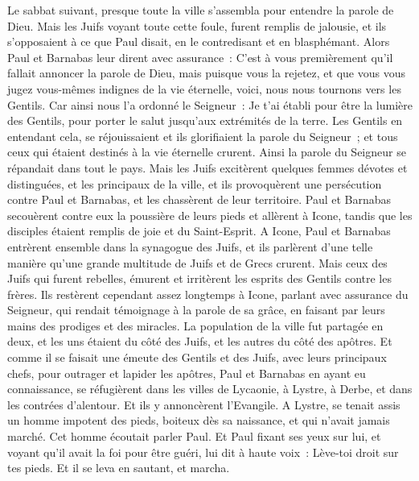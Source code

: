 \begin{multicols}{2}
Le sabbat suivant, presque toute la ville s'assembla pour entendre la parole de Dieu.
Mais les Juifs voyant toute cette foule, furent remplis de jalousie, et ils s'opposaient à ce que Paul disait, en le contredisant et en blasphémant.
Alors Paul et Barnabas leur dirent avec assurance~: C'est à vous premièrement qu'il fallait annoncer la parole de Dieu, mais puisque vous la rejetez, et que vous vous jugez vous-mêmes indignes de la vie éternelle, voici, nous nous tournons vers les Gentils.
Car ainsi nous l'a ordonné le Seigneur~: Je t'ai établi pour être la lumière des Gentils, pour porter le salut jusqu'aux extrémités de la terre.
Les Gentils en entendant cela, se réjouissaient et ils glorifiaient la parole du Seigneur~; et tous ceux qui étaient destinés à la vie éternelle crurent.
Ainsi la parole du Seigneur se répandait dans tout le pays.
Mais les Juifs excitèrent quelques femmes dévotes et distinguées, et les principaux de la ville, et ils provoquèrent une persécution contre Paul et Barnabas, et les chassèrent de leur territoire.
Paul et Barnabas secouèrent contre eux la poussière de leurs pieds et allèrent à Icone,
tandis que les disciples étaient remplis de joie et du Saint-Esprit.
\VerseOne{}A Icone, Paul et Barnabas entrèrent ensemble dans la synagogue des Juifs, et ils parlèrent d'une telle manière qu'une grande multitude de Juifs et de Grecs crurent.
Mais ceux des Juifs qui furent rebelles, émurent et irritèrent les esprits des Gentils contre les frères.
Ils restèrent cependant assez longtemps à Icone, parlant avec assurance du Seigneur, qui rendait témoignage à la parole de sa grâce, en faisant par leurs mains des prodiges et des miracles.
La population de la ville fut partagée en deux, et les uns étaient du côté des Juifs, et les autres du côté des apôtres.
Et comme il se faisait une émeute des Gentils et des Juifs, avec leurs principaux chefs, pour outrager et lapider les apôtres,
Paul et Barnabas en ayant eu connaissance, se réfugièrent dans les villes de Lycaonie, à Lystre, à Derbe, et dans les contrées d'alentour.
Et ils y annoncèrent l'Evangile.
A Lystre, se tenait assis un homme impotent des pieds, boiteux dès sa naissance, et qui n'avait jamais marché.
Cet homme écoutait parler Paul. Et Paul fixant ses yeux sur lui, et voyant qu'il avait la foi pour être guéri,
lui dit à haute voix~: Lève-toi droit sur tes pieds. Et il se leva en sautant, et marcha.

\end{multicols}
